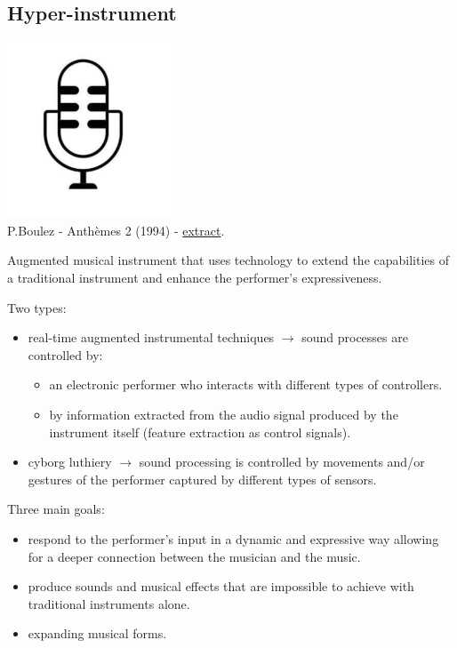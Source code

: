 \subsection{Hyper-instrument}\label{hyper-instrument}

\begin{center}
\includegraphics[scale=0.6]{../img/lel.png}\\
P.Boulez - Anthèmes 2 (1994) - \href{https://github.com/musicaecodice/EMC/blob/main/2_instruments/suoni/boulez1.mp4}{extract}.
\end{center}

Augmented musical instrument that uses technology to extend the capabilities of a traditional instrument and enhance the performer's expressiveness.

Two types:

\begin{itemize}
\tightlist
\item real-time augmented instrumental techniques \(\rightarrow\) sound processes are controlled by:

  \begin{itemize}
  \tightlist
  \item an electronic performer who interacts with different types of controllers.
  \item by information extracted from the audio signal produced by the instrument itself (feature extraction as control signals).
  \end{itemize}
\item cyborg luthiery \(\rightarrow\) sound processing is controlled by movements and/or gestures of the performer captured by different types of sensors.
\end{itemize}

Three main goals:

\begin{itemize}
\tightlist
\item respond to the performer's input in a dynamic and expressive way allowing for a deeper connection between the musician and the music.
\item produce sounds and musical effects that are impossible to achieve with traditional instruments alone.
\item expanding musical forms.
\end{itemize}

